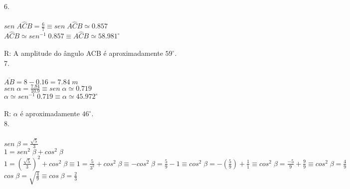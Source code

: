 \documentclass[12pt]{article}
\begin{document}
6.\\\\
$sen\;A\hat{C}B=\frac{6}{7}\equiv sen\;A\hat{C}B\simeq0.857$\\
$A\hat{C}B\simeq sen^{-1}\;0.857\equiv A\hat{C}B\simeq58.981^{\circ}$\\\\
R: A amplitude do ângulo ACB é aproximadamente $59^{\circ}$.\\

7.\\\\
$\overline{AB}=8-0.16=7.84\;m$\\
$sen\;\alpha=\frac{7.84}{10.9}\equiv sen\;\alpha\simeq0.719$\\
$\alpha\simeq sen^{-1}\;0.719\equiv\alpha\simeq 45.972^{\circ}$\\\\
R: $\alpha$ é aproximadamente $46^{\circ}$.\\

8.\\\\
$sen\;\beta=\frac{\sqrt{5}}{3}$\\
$1=sen^2\;\beta+cos^2\;\beta$\\
$1=(\frac{\sqrt{5}}{3})^2+cos^2\;\beta\equiv1=\frac{5}{3^2}+cos^2\;\beta\equiv-cos^2\;\beta=\frac{5}{9}-1\equiv cos^2\;\beta=-(\frac{5}{9})+\frac{1}{1}\equiv cos^2\;\beta=\frac{-5}{9}+\frac{9}{9}\equiv cos^2\;\beta=\frac{4}{9}$\\
$cos\;\beta=\sqrt{\frac{4}{9}}\equiv cos\;\beta=\frac{2}{3}$\\
\end{document}

